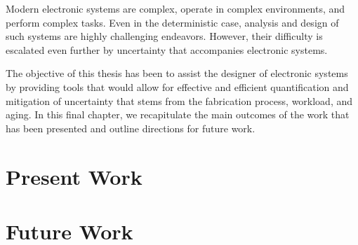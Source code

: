 Modern electronic systems are complex, operate in complex environments, and
perform complex tasks. Even in the deterministic case, analysis and design of
such systems are highly challenging endeavors. However, their difficulty is
escalated even further by uncertainty that accompanies electronic systems.

The objective of this thesis has been to assist the designer of electronic
systems by providing tools that would allow for effective and efficient
quantification and mitigation of uncertainty that stems from the fabrication
process, workload, and aging. In this final chapter, we recapitulate the main
outcomes of the work that has been presented and outline directions for future
work.

\section{Present Work}

\section{Future Work}
